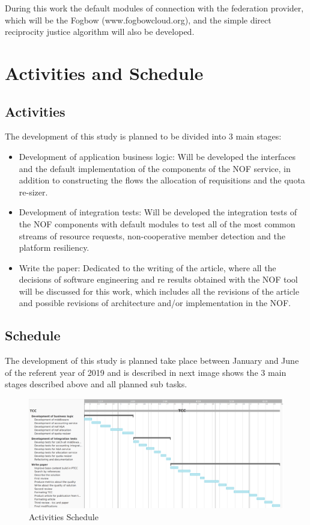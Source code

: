 \documentclass{article}
\begin{document}
During this work the default modules of connection with the federation provider, which will be the Fogbow (www.fogbowcloud.org), and the simple direct reciprocity justice algorithm will also be developed.

\section{Activities and Schedule}

\subsection{Activities}
The development of this study is planned to be divided into 3 main stages:

\begin{itemize}
    \item Development of application business logic: 
	Will be developed the interfaces and the default implementation of the components of the NOF service, in addition to constructing the flows the allocation of requisitions and the quota re-sizer.
	\item Development of integration tests:
	Will be developed the integration tests of the NOF components with default modules to test all of the most common streams of resource requests, non-cooperative member detection and the platform resiliency.
	\item Write the paper:
	Dedicated to the writing of the article, where all the decisions of software engineering and re results obtained with the NOF tool will be discussed for this work, which includes all the revisions of the article and possible revisions of architecture and/or implementation in the NOF.
\end{itemize}
    
\subsection{Schedule}

The development of this study is planned take place between January and June of the referent year of 2019 and is described in next image shows the 3 main stages described above and all planned sub tasks.

\begin{figure}[h!]
    \centering
    \includegraphics[scale=0.35]{./image/TCC-schedule.png}
    \caption{Activities Schedule}
\end{figure}
\end{document}
